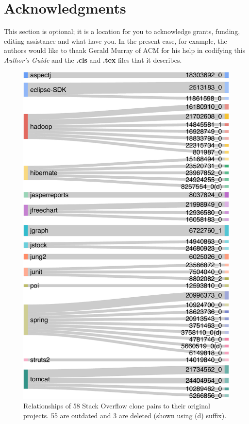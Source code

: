 \documentclass[sigconf,review, anonymous]{acmart}
\begin{document}
\section{Acknowledgments}
This section is optional; it is a location for you
to acknowledge grants, funding, editing assistance and
what have you.  In the present case, for example, the
authors would like to thank Gerald Murray of ACM for
his help in codifying this \textit{Author's Guide}
and the \textbf{.cls} and \textbf{.tex} files that it describes.

\begin{figure}
	\centering
	\includegraphics[width=\linewidth]{Sankey_proj}
	\caption{Relationships of 58 Stack Overflow clone pairs to their original projects. 55 are outdated and 3 are deleted (shown using (d) suffix).}
	\label{fig:sankey}
\end{figure}

%

  
\end{document}
